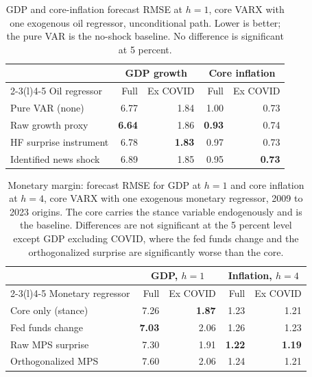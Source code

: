 \documentclass[conference]{IEEEtran}
\begin{document}
\begin{table}[t]
\caption{GDP and core-inflation forecast RMSE at $h=1$, core VARX with one exogenous oil regressor, unconditional path. Lower is better; the pure VAR is the no-shock baseline. No difference is significant at 5 percent.}
\label{tab:id}
\centering
\small
\setlength{\tabcolsep}{4pt}
\begin{tabular}{@{}lrrrr@{}}
\toprule
& \multicolumn{2}{c}{GDP growth} & \multicolumn{2}{c}{Core inflation} \\
\cmidrule(l){2-3}\cmidrule(l){4-5}
Oil regressor & Full & Ex COVID & Full & Ex COVID \\
\midrule
Pure VAR (none) & 6.77 & 1.84 & 1.00 & 0.73 \\
Raw growth proxy & \textbf{6.64} & 1.86 & \textbf{0.93} & 0.74 \\
HF surprise instrument & 6.78 & \textbf{1.83} & 0.97 & 0.73 \\
Identified news shock & 6.89 & 1.85 & 0.95 & \textbf{0.73} \\
\bottomrule
\end{tabular}
\end{table}

\begin{table}[t]
\caption{Monetary margin: forecast RMSE for GDP at $h=1$ and core inflation at $h=4$, core VARX with one exogenous monetary regressor, 2009 to 2023 origins. The core carries the stance variable endogenously and is the baseline. Differences are not significant at the 5 percent level except GDP excluding COVID, where the fed funds change and the orthogonalized surprise are significantly worse than the core.}
\label{tab:mp}
\centering
\small
\setlength{\tabcolsep}{4pt}
\begin{tabular}{@{}lrrrr@{}}
\toprule
& \multicolumn{2}{c}{GDP, $h{=}1$} & \multicolumn{2}{c}{Inflation, $h{=}4$} \\
\cmidrule(l){2-3}\cmidrule(l){4-5}
Monetary regressor & Full & Ex COVID & Full & Ex COVID \\
\midrule
Core only (stance) & 7.26 & \textbf{1.87} & 1.23 & 1.21 \\
Fed funds change & \textbf{7.03} & 2.06 & 1.26 & 1.23 \\
Raw MPS surprise & 7.30 & 1.91 & \textbf{1.22} & \textbf{1.19} \\
Orthogonalized MPS & 7.60 & 2.06 & 1.24 & 1.21 \\
\bottomrule
\end{tabular}
\end{table}
\end{document}
